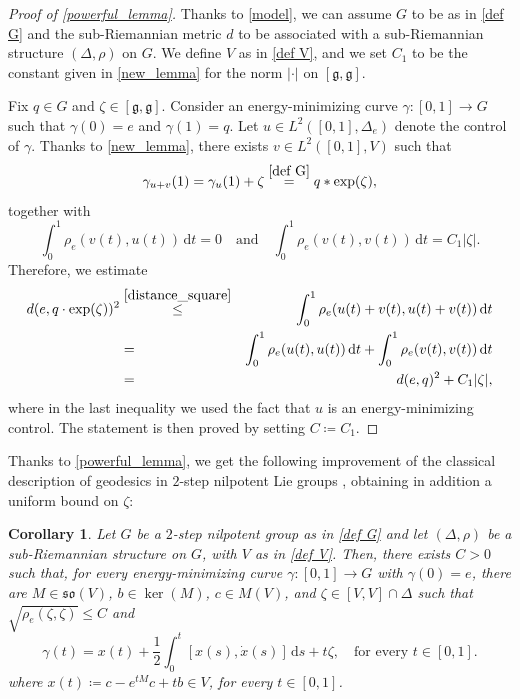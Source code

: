 \documentclass[a4paper,11pt,reqno]{amsart}
\theoremstyle{plain}
\newtheorem{corollary}[theorem]{Corollary}
\theoremstyle{definition}
\newcommand{\g}{\mathfrak{g}}
\newcommand{\id}{e}
\newcommand{\de}{\mathrm{d}}
\newcommand{\coloneq}{\coloneqq}
\begin{document}
\begin{proof}[Proof of \cref{powerful_lemma}] Thanks to \cref{model}, we can assume $G$ to be as in \eqref{def G} and the sub-Riemannian metric $d$ to be associated with a sub-Riemannian structure $(\Delta,\rho)$ on $G$. We define $V$ as in \eqref{def V}, and we set $C_1$ to be the constant given in \cref{new_lemma} for the norm $\lvert \cdot \rvert$ on $[\g,\g]$.

Fix $q \in G$ and $\zeta \in [\g,\g]$. Consider an energy-minimizing curve $\gamma \colon [0,1] \to G$ such that $\gamma(0)=\id$ and $\gamma(1)=q$. Let $u \in L^2([0,1],\Delta_\id)$ denote the control of $\gamma$. Thanks to \cref{new_lemma}, there exists $v \in L^2([0,1],V)$ such that 
\begin{equation*}
 \gamma_{u+v}(1) = \gamma_u(1) + \zeta \stackrel{\eqref{def G}}{=} q * \exp(\zeta),
 \end{equation*}
 together with
 \begin{equation*}
 \int^1_0 \rho_\id(v(t),u(t))\, \de t =0 \quad \text{and} \quad \int^1_0 \rho_\id(v(t),v(t))\, \de t = C_1 \lvert \zeta \rvert.
 \end{equation*}
 Therefore, we estimate
 \begin{eqnarray*}
 d(e,q \cdot \exp(\zeta))^2 &\stackrel{\eqref{distance_square}}{\le}& \int^1_0 \rho_\id(u(t) + v(t),u(t) + v(t))\, \de t \\
 &=& \int^1_0 \rho_\id(u(t),u(t))\, \de t + \int^1_0 \rho_\id(v(t),v(t))\, \de t \\
 &=& d(e,q)^2 + C_1 \lvert \zeta \rvert,
 \end{eqnarray*}
 where in the last inequality we used the fact that $u$ is an energy-minimizing control. The statement is then proved by setting $C\coloneq C_1$.
\end{proof}

Thanks to \cref{powerful_lemma}, we get the following improvement of the classical description of geodesics in $2$-step nilpotent Lie groups \cite[Proposition~7.3.10]{donne2024metricliegroupscarnotcaratheodory}, obtaining in addition a uniform bound on $\zeta$:

\begin{corollary} \label{bounded drift}
 Let $G$ be a $2$-step nilpotent group as in \eqref{def G} and let $(\Delta,\rho)$ be a sub-Riemannian structure on $G$, with $V$ as in \eqref{def V}. Then, there exists $C > 0$ such that, for every energy-minimizing curve $\gamma \colon [0,1] \to G$ with $\gamma(0) = \id$, there are $M \in \mathfrak{so}(V)$, $b \in \ker(M)$, $c \in M(V)$, and $\zeta \in [V,V] \cap \Delta$ such that $\sqrt{\rho_\id(\zeta,\zeta)}\le C$ and
	\begin{equation} \label{equation_geodesic}
 \gamma(t)= x(t) + \frac{1}{2}\int^t_0 [x(s),\dot{x}(s)] \, \de s + t\zeta, \quad \text{for every $t \in [0,1]$.}
	\end{equation}
 where $x(t) \coloneq c - e^{tM}c + tb \in V$, for every $t \in [0,1]$.
\end{corollary}
\end{document}
